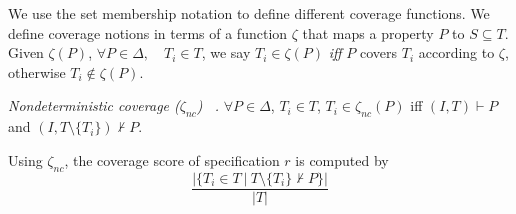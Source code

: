 We use the set membership notation to define different coverage functions. We define coverage notions in terms of a function $\zeta$ that maps a property $P$ to $S \subseteq T$. Given $\zeta(P)$, $\forall P \in \Delta,\quad T_i \in T$, we say $T_i \in \zeta(P)$ \emph{iff} $P$ covers $T_i$ according to $\zeta$,
 otherwise $T_i \notin \zeta(P)$.
 
\begin{definition} {\emph{Nondeterministic coverage ($\zeta_{nc}$) ~\cite{chockler2010coverage}.} }
\label{def:non-det}
$\forall P \in \Delta$, $T_i \in T$, $T_i \in \zeta_{nc}(P)$ iff
$(I, T) \vdash P$ and $(I, T \setminus \{T_i\}) \nvdash P$.
\end{definition}

Using  $\zeta_{nc}$, the coverage score of specification $r$ is computed by
\[
   \frac{ | \{T_i \in T~|~ T \setminus \{T_i\} \nvdash P\} |}{|T|}
\]



